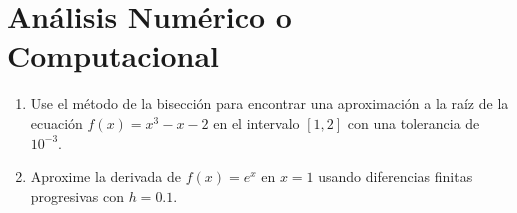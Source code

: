 \section{Análisis Numérico o Computacional}

\begin{enumerate}
    \item Use el método de la bisección para encontrar una aproximación a la raíz de la ecuación \(f(x)=x^3-x-2\) en el intervalo \([1,2]\) con una tolerancia de \(10^{-3}\).
    \item Aproxime la derivada de \(f(x)=e^x\) en \(x=1\) usando diferencias finitas progresivas con \(h=0.1\).
\end{enumerate}